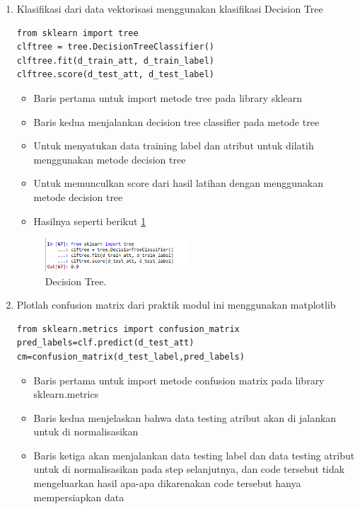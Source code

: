 \begin{enumerate}
\item Klasifikasi dari data vektorisasi menggunakan klasifikasi Decision Tree \par
\begin{verbatim}
from sklearn import tree
clftree = tree.DecisionTreeClassifier()
clftree.fit(d_train_att, d_train_label)
clftree.score(d_test_att, d_test_label)
\end{verbatim}
\begin{itemize}
\item Baris pertama untuk import metode tree pada library sklearn
\item Baris kedua menjalankan decision tree classifier pada metode tree
\item Untuk menyatukan data training label dan atribut untuk dilatih menggunakan metode decision tree
\item Untuk memunculkan score dari hasil latihan dengan menggunakan metode decision tree
\item Hasilnya seperti berikut \ref{yt12}
\end{itemize}
		\begin{figure}[ht]
		\centerline{\includegraphics[width=0.5\textwidth]{figures/im/yt12.png}}
		\caption{Decision Tree.}
		\label{yt12}
		\end{figure}

\item Plotlah confusion matrix dari praktik modul ini menggunakan matplotlib \par
\begin{verbatim}
from sklearn.metrics import confusion_matrix
pred_labels=clf.predict(d_test_att)
cm=confusion_matrix(d_test_label,pred_labels)
\end{verbatim}
\begin{itemize}
\item Baris pertama untuk import metode confusion matrix pada library sklearn.metrics
\item Baris kedua menjelaskan bahwa data testing atribut akan di jalankan untuk di normalisasikan
\item Baris ketiga akan menjalankan data testing label dan data testing atribut untuk di normalisasikan pada step selanjutnya, dan code tersebut tidak mengeluarkan hasil apa-apa dikarenakan code tersebut hanya mempersiapkan data
\end{itemize}


\end{enumerate}
